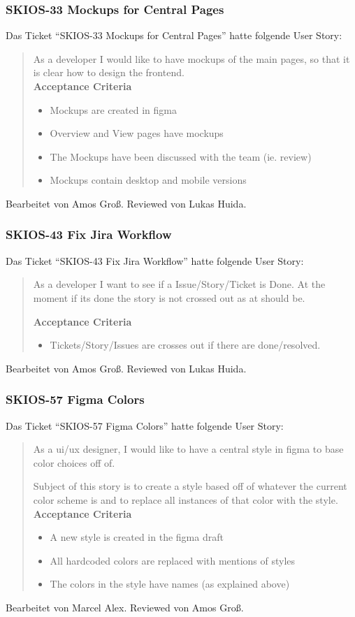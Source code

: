 \subsubsection{SKIOS-33 Mockups for Central Pages}
Das Ticket \enquote{SKIOS-33 Mockups for Central Pages} hatte folgende User Story:
\begin{quotation}
    As a developer I would like to have mockups of the main pages, so that it is clear how to design the frontend. \\
\textbf{Acceptance Criteria}
\begin{itemize}
    \item Mockups are created in figma
    \item Overview and View pages have mockups
    \item The Mockups have been discussed with the team (ie. review)
    \item Mockups contain desktop and mobile versions
\end{itemize}
\end{quotation}
Bearbeitet von Amos Groß.
Reviewed von Lukas Huida.

\subsubsection{SKIOS-43 Fix Jira Workflow}
Das Ticket \enquote{SKIOS-43 Fix Jira Workflow} hatte folgende User Story:
\begin{quotation}
    As a developer I want to see if a Issue/Story/Ticket is Done. At the moment if its done the story is not crossed out as at should be.
 
\textbf{Acceptance Criteria}
\begin{itemize}
    \item Tickets/Story/Issues are crosses out if there are done/resolved.
\end{itemize}
\end{quotation}
Bearbeitet von Amos Groß.
Reviewed von Lukas Huida.

\subsubsection{SKIOS-57 Figma Colors}
Das Ticket \enquote{SKIOS-57 Figma Colors} hatte folgende User Story:
\begin{quotation}
    As a ui/ux designer, I would like to have a central style in figma to base color choices off of.

    Subject of this story is to create a style based off of whatever the current color scheme is and to replace all instances of that color with the style.
\textbf{Acceptance Criteria}
\begin{itemize}
    \item A new style is created in the figma draft
    \item All hardcoded colors are replaced with mentions of styles
    \item The colors in the style have names (as explained above)
\end{itemize}
\end{quotation}
Bearbeitet von Marcel Alex.
Reviewed von Amos Groß.

